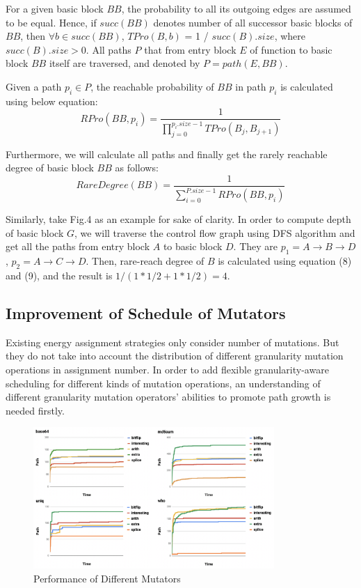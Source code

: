 For a given basic block $BB$, the probability to all its outgoing edges are assumed to be equal. Hence, if $succ(BB)$ denotes number of all successor basic blocks of $BB$, then $\forall b \in succ(BB)$, $TPro(B, b)$ = 1 / $succ(B).size$, where $succ(B).size > 0$.  All paths $P$ that from entry block $E$ of function to basic block $BB$ itself are traversed, and denoted by $P=path(E, BB)$.

Given a path $p_{i} \in P$, the reachable probability of $BB$ in path $p_{i}$ is calculated using below equation:
\begin{equation}
RPro(BB,p_{i})=\dfrac{1}{\prod_{j=0}^{p_{i}.size -1} TPro(B_{j}, B_{j+1})} 
\end{equation}

Furthermore, we will calculate all paths and finally get the rarely reachable degree of basic block $BB$ as follows:
\begin{equation}
RareDegree(BB)= \dfrac{1}{ \sum_{i=0}^{P.size - 1} RPro(BB, p_{i})}
\end{equation}

Similarly, take Fig.4 as an example for sake of clarity. In order to compute depth of basic block $G$, we will traverse the control flow graph using DFS algorithm and get all the paths from entry block $A$ to basic block $D$. They are $p_{1}=A\rightarrow B\rightarrow D$, $p_{2}=A\rightarrow C\rightarrow D$.  Then,  rare-reach degree of $B$ is calculated using equation (8) and (9), and the result is $1/(1* 1/2 + 1 *1/2) = 4$. 


\subsection{Improvement of Schedule of Mutators}
Existing energy assignment strategies only consider number of mutations. But they do not take into account the distribution of different granularity mutation operations in assignment number. In order to add flexible granularity-aware scheduling for different kinds of mutation operations, an understanding of different granularity mutation operators' abilities to promote path growth is needed firstly.

\begin{figure}[t]
    \centering
    \includegraphics[width=3.6in]{pic/Mutators.png}
    \caption{Performance of Different Mutators }
    \label{Mutators}
\end{figure}

